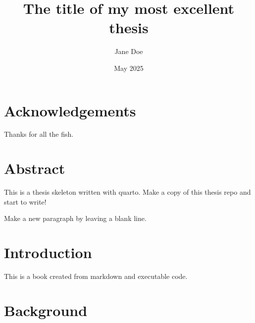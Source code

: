 \documentclass[
  a4paper,
  headsepline=true,
  open=any]{scrbook}
\title{The title of my most excellent thesis}
\author{Jane Doe}
\date{May 2025}
\begin{document}
\frontmatter
\maketitle
\ifdefined\Shaded\renewenvironment{Shaded}{\begin{tcolorbox}[enhanced, sharp corners, boxrule=0pt, breakable, interior hidden, frame hidden, borderline west={3pt}{0pt}{shadecolor}]}{\end{tcolorbox}}\fi

\mainmatter
{}

\hypertarget{acknowledgements}{%
\chapter*{Acknowledgements}\label{acknowledgements}}


Thanks for all the fish.


\hypertarget{abstract}{%
\chapter*{Abstract}\label{abstract}}


This is a thesis skeleton written with quarto. Make a copy of this
thesis repo and start to write!

Make a new paragraph by leaving a blank line.

\newpage
\tableofcontents


\hypertarget{introduction}{%
\chapter{Introduction}\label{introduction}}

This is a book created from markdown and executable code.


\hypertarget{background}{%
\chapter{Background}\label{background}}

\end{document}
